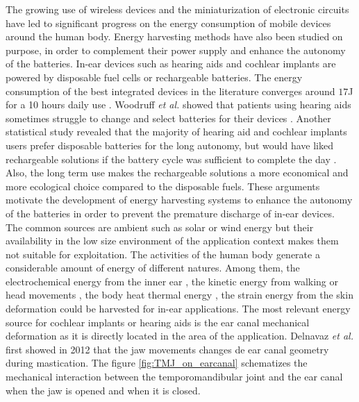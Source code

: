 \documentclass[3p,twocolumn,preprint]{elsarticle}
\begin{document}
The growing use of wireless devices and the miniaturization of electronic circuits have led to significant progress on the energy consumption of mobile devices around the human body. Energy harvesting methods have also been studied on purpose, in order to complement their power supply and enhance the autonomy of the batteries. In-ear devices such as hearing aids and cochlear implants are powered by disposable fuel cells or rechargeable batteries. The energy consumption of the best integrated devices in the literature converges around $17$J for a 10 hours daily use \cite{Scherer2019,Yip2015,Kulah2022}. Woodruff \emph{et al.} showed that patients using hearing aids sometimes struggle to change and select batteries for their devices \cite{Woodruff2021}. Another statistical study revealed that the majority of hearing aid and cochlear implants users prefer disposable batteries for the long autonomy, but would have liked rechargeable solutions if the battery cycle was sufficient to complete the day \cite{PracticesAudiology2016}. Also, the long term use makes the rechargeable solutions a more economical and more ecological choice compared to the disposable fuels. These arguments motivate the development of energy harvesting systems to enhance the autonomy of the batteries in order to prevent the premature discharge of in-ear devices.\\
The common sources are ambient such as solar or wind energy but their availability in the low size environment of the application context makes them not suitable for exploitation.
The activities of the human body generate a considerable amount of energy of different natures. Among them, the electrochemical energy from the inner ear \cite{Mercier2012}, the kinetic energy from walking or head movements \cite{Azimi2021,Smilek2016}, the body heat thermal energy \cite{Kim2014}, the strain energy from the skin deformation \cite{Jin2021} could be harvested for in-ear applications. The most relevant energy source for cochlear implants or hearing aids is the ear canal mechanical deformation as it is directly located in the area of the application. Delnavaz \emph{et al.} first showed in 2012 that the jaw movements changes de ear canal geometry during mastication. The figure \ref{fig:TMJ_on_earcanal} schematizes the mechanical interaction between the temporomandibular joint and the ear canal when the jaw is opened and when it is closed.
\end{document}

